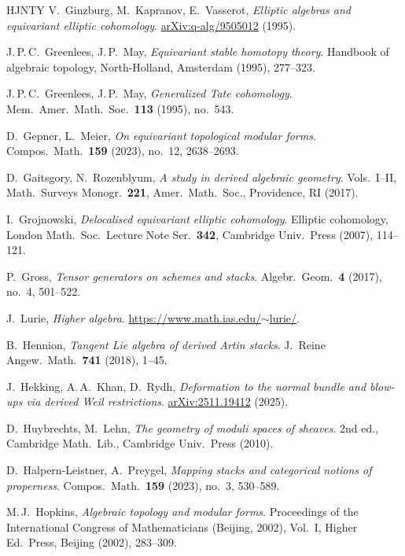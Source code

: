\documentclass[12pt, oneside]{amsart}
\newcommand\arXiv[1]{\href{http://arxiv.org/abs/#1}{arXiv:#1}}
\numberwithin{equation}{section}
\theoremstyle{remark}
\theoremstyle{plain}
\begin{document}
\begin{thebibliography}{HJNTY}
   V.~Ginzburg, M.~Kapranov, E.~Vasserot, \textit{Elliptic algebras and equivariant elliptic cohomology}. \arXiv{q-alg/9505012} (1995).

   J.\,P.\,C.~Greenlees, J.\,P.~May, \textit{Equivariant stable homotopy theory}. Handbook of algebraic topology, North-Holland, Amsterdam (1995), 277--323.

   J.\,P.\,C.~Greenlees, J.\,P.~May, \textit{Generalized Tate cohomology}. Mem.\ Amer.\ Math.\ Soc.\ {\bf{113}} (1995), no.~543.

   D.~Gepner, L.~Meier, \textit{On equivariant topological modular forms}. Compos.\ Math.\ {\bf{159}} (2023), no.~12, 2638--2693.

   D.~Gaitsgory, N.~Rozenblyum, \textit{A study in derived algebraic geometry}. Vols.~I--II, Math.\ Surveys Monogr.\ {\bf{221}}, Amer.\ Math.\ Soc., Providence, RI (2017).

   I.~Grojnowski, \textit{Delocalised equivariant elliptic cohomology}. Elliptic cohomology, London Math.\ Soc.\ Lecture Note Ser.\ {\bf{342}}, Cambridge Univ.\ Press (2007), 114--121.

   P.~Gross, \textit{Tensor generators on schemes and stacks}. Algebr.\ Geom.\ {\bf{4}} (2017), no.~4, 501--522.

   J.~Lurie, \textit{Higher algebra}. \href{https://www.math.ias.edu/~lurie/}{https://www.math.ias.edu/$\sim$lurie/}.

   B.~Hennion, \textit{Tangent Lie algebra of derived Artin stacks}. J.\ Reine Angew.\ Math.\ {\bf{741}} (2018), 1--45.

   J.~Hekking, A.\,A.~Khan, D.~Rydh, \textit{Deformation to the normal bundle and blow-ups via derived Weil restrictions}. \arXiv{2511.19412} (2025).

   D.~Huybrechts, M.~Lehn, \textit{The geometry of moduli spaces of sheaves}. 2nd ed., Cambridge Math.\ Lib., Cambridge Univ.\ Press (2010).

   D.~Halpern-Leistner, A.~Preygel, \textit{Mapping stacks and categorical notions of properness}. Compos.\ Math.\ {\bf{159}} (2023), no.~3, 530--589.

   M.\,J.~Hopkins, \textit{Algebraic topology and modular forms}. Proceedings of the International Congress of Mathematicians (Beijing, 2002), Vol.~I, Higher Ed.\ Press, Beijing (2002), 283--309.


\end{thebibliography}
\end{document}
